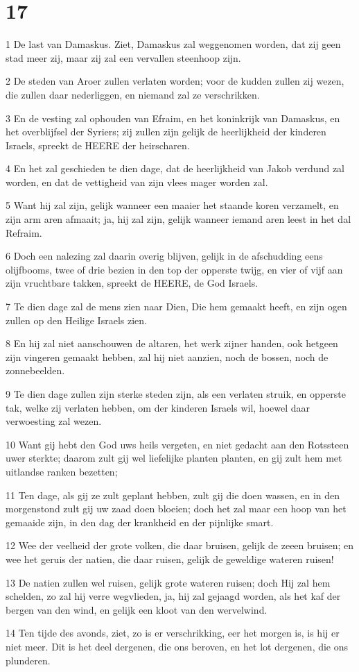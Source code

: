 \chapter{17}

\par 1 De last van Damaskus. Ziet, Damaskus zal weggenomen worden, dat zij geen stad meer zij, maar zij zal een vervallen steenhoop zijn.
\par 2 De steden van Aroer zullen verlaten worden; voor de kudden zullen zij wezen, die zullen daar nederliggen, en niemand zal ze verschrikken.
\par 3 En de vesting zal ophouden van Efraim, en het koninkrijk van Damaskus, en het overblijfsel der Syriers; zij zullen zijn gelijk de heerlijkheid der kinderen Israels, spreekt de HEERE der heirscharen.
\par 4 En het zal geschieden te dien dage, dat de heerlijkheid van Jakob verdund zal worden, en dat de vettigheid van zijn vlees mager worden zal.
\par 5 Want hij zal zijn, gelijk wanneer een maaier het staande koren verzamelt, en zijn arm aren afmaait; ja, hij zal zijn, gelijk wanneer iemand aren leest in het dal Refraim.
\par 6 Doch een nalezing zal daarin overig blijven, gelijk in de afschudding eens olijfbooms, twee of drie bezien in den top der opperste twijg, en vier of vijf aan zijn vruchtbare takken, spreekt de HEERE, de God Israels.
\par 7 Te dien dage zal de mens zien naar Dien, Die hem gemaakt heeft, en zijn ogen zullen op den Heilige Israels zien.
\par 8 En hij zal niet aanschouwen de altaren, het werk zijner handen, ook hetgeen zijn vingeren gemaakt hebben, zal hij niet aanzien, noch de bossen, noch de zonnebeelden.
\par 9 Te dien dage zullen zijn sterke steden zijn, als een verlaten struik, en opperste tak, welke zij verlaten hebben, om der kinderen Israels wil, hoewel daar verwoesting zal wezen.
\par 10 Want gij hebt den God uws heils vergeten, en niet gedacht aan den Rotssteen uwer sterkte; daarom zult gij wel liefelijke planten planten, en gij zult hem met uitlandse ranken bezetten;
\par 11 Ten dage, als gij ze zult geplant hebben, zult gij die doen wassen, en in den morgenstond zult gij uw zaad doen bloeien; doch het zal maar een hoop van het gemaaide zijn, in den dag der krankheid en der pijnlijke smart.
\par 12 Wee der veelheid der grote volken, die daar bruisen, gelijk de zeeen bruisen; en wee het geruis der natien, die daar ruisen, gelijk de geweldige wateren ruisen!
\par 13 De natien zullen wel ruisen, gelijk grote wateren ruisen; doch Hij zal hem schelden, zo zal hij verre wegvlieden, ja, hij zal gejaagd worden, als het kaf der bergen van den wind, en gelijk een kloot van den wervelwind.
\par 14 Ten tijde des avonds, ziet, zo is er verschrikking, eer het morgen is, is hij er niet meer. Dit is het deel dergenen, die ons beroven, en het lot dergenen, die ons plunderen.

